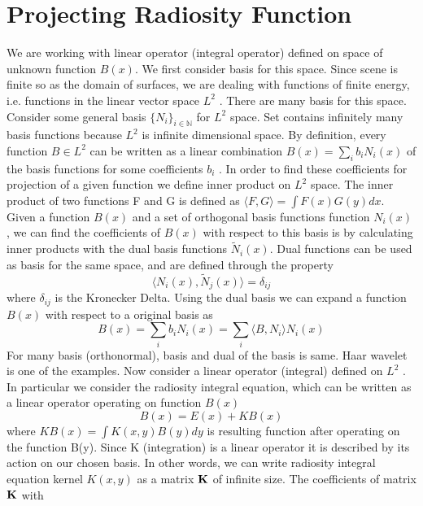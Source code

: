 \section{Projecting Radiosity Function}
We are working with linear operator (integral operator) defined on space of unknown function $B(x)$.  We first consider basis for this space. Since scene is finite so as the domain of surfaces, we are dealing with functions of finite energy, i.e. functions
in the linear vector space $L^2$ . There are many basis for
this space. Consider some general basis $\{N_i \}_{i \in \mathbb{N}}$ for $L^2$ space. Set contains infinitely many basis functions because $L^2$ is infinite dimensional space.
By definition, every function $B \in L^2$ can be written as a linear combination  $B(x) = \sum _i b_i N_i(x)$ of the basis functions for
some coefficients $b_i$ . In order to find these coefficients for projection of a given
function we define inner product on $L^2$ space. The inner product of
two functions F and G is defined as $\langle F, G \rangle  = \int F(x) G(y) dx$.
Given a function $B(x)$ and a set of orthogonal basis functions function $N_i(x)$ , we can find the coefficients of $B(x)$ with respect to this basis is by
calculating inner products with the dual basis functions $\tilde{N}_i(x)$. Dual functions can be used as basis for the same space, and are defined
through the property
\begin{equation}
\langle N_i(x),\tilde{N}_j(x) \rangle =\delta_{ij}
\end{equation}
where $\delta_{ij}$ is the Kronecker Delta. Using the dual basis we can expand a function  $B(x)$ with respect to a original basis as
\begin{equation}\label{eq:radproj}
B(x) = \sum_ib_iN_i(x)= \sum_i\langle B,N_i \rangle N_i(x)
\end{equation}
For many basis (orthonormal), basis and dual of the basis is same. Haar wavelet is one of the examples. 
Now consider a linear operator (integral) defined on $L^2$ . In particular we consider the radiosity
integral equation, which can be written as a linear operator operating on function $B(x)$\\
\begin{equation}
B(x)=E(x)+KB(x)
\end{equation}
where $KB(x) = \int K(x, y)B(y)dy$ is resulting function after operating on the function B(y). Since K (integration) is a linear operator it
is described by its action on our chosen basis. In other words, we
can write radiosity integral equation  kernel $K(x,y)$ as a matrix $\bf{K}$ of  infinite size. The coefficients of matrix $\bf{K}$  with
